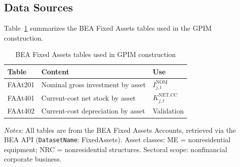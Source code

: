 \subsection{Data Sources}
\label{app:A1:data}

Table~\ref{tab:A1:data_sources} summarizes the BEA Fixed Assets
tables used in the GPIM construction.

\begin{table}[htbp]
	\centering
	\caption{BEA Fixed Assets tables used in GPIM construction}
	\label{tab:A1:data_sources}
	\small
	\begin{tabular}{@{}lll@{}}
		\toprule
		\textbf{Table} & \textbf{Content} & \textbf{Use} \\
		\midrule
		FAAt201 & Nominal gross investment by asset & $I^{\text{NOM}}_{j,t}$ \\
		FAAt401 & Current-cost net stock by asset & $K^{\text{NET,CC}}_{j,t}$ \\
		FAAt402 & Current-cost depreciation by asset & Validation \\
		\bottomrule
	\end{tabular}
	\begin{minipage}{\textwidth}
		\footnotesize
		\textit{Notes:} All tables are from the BEA Fixed Assets Accounts,
		retrieved via the BEA API (\texttt{DatasetName}: FixedAssets).
		Asset classes: ME = nonresidential equipment; NRC = nonresidential
		structures. Sectoral scope: nonfinancial corporate business.
	\end{minipage}
\end{table}